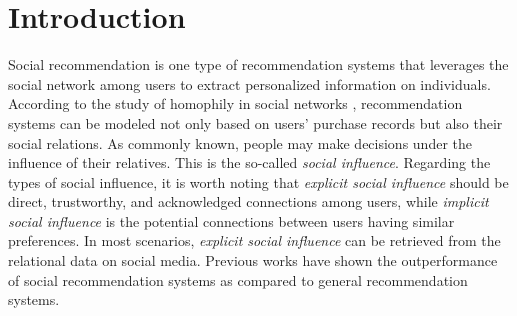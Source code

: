 \documentclass[letterpaper]{article} %
\begin{document}
\section{Introduction}
Social recommendation is one type of recommendation systems that leverages the social network among users to extract personalized information on individuals. According to the study of homophily in social networks \cite{birds_of_feather, dual_graph}, recommendation systems can be modeled not only based on users' purchase records but also their social relations. As commonly known, people may make decisions under the influence of their relatives. This is the so-called \textit{social influence}. Regarding the types of social influence, it is worth noting that \textit{explicit social influence} should be direct, trustworthy, and acknowledged connections among users, while \textit{implicit social influence} is the potential connections between users having similar preferences. In most scenarios, \textit{explicit social influence} can be retrieved from the relational data on social media. Previous works \cite{sorec, socialmf, trustsvd} have shown the outperformance of social recommendation systems as compared to general recommendation systems.
\end{document}
